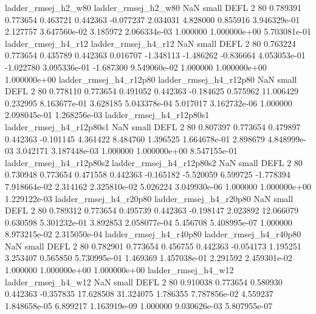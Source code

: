      ladder_rmsej_h2_w80      ladder_rmsej_h2_w80                   NaN      small     DEFL                 2 80 0.789391       0.773654 0.463721       0.442363   -0.077237      2.034031      4.828000     0.855916   3.946329e-01  2.127757 3.647560e-02     3.185972   2.066334e-03            1.000000    1.000000e+00        5.703081e-01
     ladder_rmsej_h4_r12      ladder_rmsej_h4_r12                   NaN      small     DEFL                 2 80 0.763224       0.773654 0.435789       0.442363    0.016707     -1.348113     -1.486262    -0.836664   4.053053e-01 -1.022780 3.095336e-01    -1.687300   9.549060e-02            1.000000    1.000000e+00        1.000000e+00
  ladder_rmsej_h4_r12p80   ladder_rmsej_h4_r12p80                   NaN      small     DEFL                 2 80 0.778110       0.773654 0.491052       0.442363   -0.184625      0.575962     11.006429     0.232995   8.163677e-01  3.628185 5.043378e-04     5.017017   3.162732e-06            1.000000    2.098045e-01        1.268256e-03
ladder_rmsej_h4_r12p80s1 ladder_rmsej_h4_r12p80s1                   NaN      small     DEFL                 2 80 0.807397       0.773654 0.479897       0.442363   -0.101145      4.361422      8.484760     1.396525   1.664678e-01  2.898679 4.848999e-03     3.042171   3.187448e-03            1.000000    1.000000e+00        8.547155e-01
ladder_rmsej_h4_r12p80s2 ladder_rmsej_h4_r12p80s2                   NaN      small     DEFL                 2 80 0.730948       0.773654 0.471558       0.442363   -0.165182     -5.520059      6.599725    -1.778394   7.918664e-02  2.314162 2.325810e-02     5.026224   3.049930e-06            1.000000    1.000000e+00        1.229122e-03
  ladder_rmsej_h4_r20p80   ladder_rmsej_h4_r20p80                   NaN      small     DEFL                 2 80 0.789312       0.773654 0.495739       0.442363   -0.198147      2.023892     12.066079     0.630598   5.301232e-01  3.892853 2.058077e-04     5.456708   5.408995e-07            1.000000    8.973215e-02        2.315050e-04
  ladder_rmsej_h4_r40p80   ladder_rmsej_h4_r40p80                   NaN      small     DEFL                 2 80 0.782901       0.773654 0.456755       0.442363   -0.054173      1.195251      3.253407     0.565850   5.730995e-01  1.469369 1.457038e-01     2.291592   2.459301e-02            1.000000    1.000000e+00        1.000000e+00
     ladder_rmsej_h4_w12      ladder_rmsej_h4_w12                   NaN      small     DEFL                 2 80 0.910038       0.773654 0.580930       0.442363   -0.357835     17.628508     31.324075     1.786355   7.787856e-02  4.559237 1.848658e-05     6.899217   1.163919e-09            1.000000    9.030626e-03        5.807955e-07
